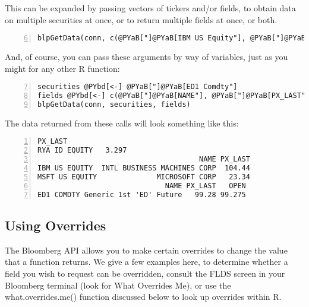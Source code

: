 \documentclass[a4paper]{article}
\begin{document}
    

This can be expanded by passing vectors of tickers and/or fields, to obtain data on multiple securities at once, or to return multiple fields at once, or both.

\begin{Verbatim}[commandchars=@\[\],numbers=left,firstnumber=6,stepnumber=1]
blpGetData(conn, c(@PYaB["]@PYaB[IBM US Equity"], @PYaB["]@PYaB[MSFT US Equity"]), c(@PYaB["]@PYaB[NAME"], @PYaB["]@PYaB[PX_LAST"]))
\end{Verbatim}

    

And, of course, you can pass these arguments by way of variables, just as you might for any other R function:

\begin{Verbatim}[commandchars=@\[\],numbers=left,firstnumber=7,stepnumber=1]
securities @PYbd[<-] @PYaB["]@PYaB[ED1 Comdty"]
fields @PYbd[<-] c(@PYaB["]@PYaB[NAME"], @PYaB["]@PYaB[PX_LAST"], @PYaB["]@PYaB[OPEN"])
blpGetData(conn, securities, fields)
\end{Verbatim}

    

The data returned from these calls will look something like this:

\begin{Verbatim}[commandchars=@\[\],numbers=left,firstnumber=1,stepnumber=1]
              PX_LAST
RYA ID EQUITY   3.297
                                      NAME PX_LAST
IBM US EQUITY  INTL BUSINESS MACHINES CORP  104.44
MSFT US EQUITY              MICROSOFT CORP   23.34
                              NAME PX_LAST   OPEN
ED1 COMDTY Generic 1st 'ED' Future   99.28 99.275
\end{Verbatim}

    


\subsection{Using Overrides} %
\label{sub:using_overrides}

The Bloomberg API allows you to make certain overrides to change the value that a function returns. We give a few examples here, to determine whether a field you wish to request can be overridden, consult the FLDS screen in your Bloomberg terminal (look for What Overrides Me), or use the what.overrides.me() function discussed below to look up overrides within R.
\end{document}
